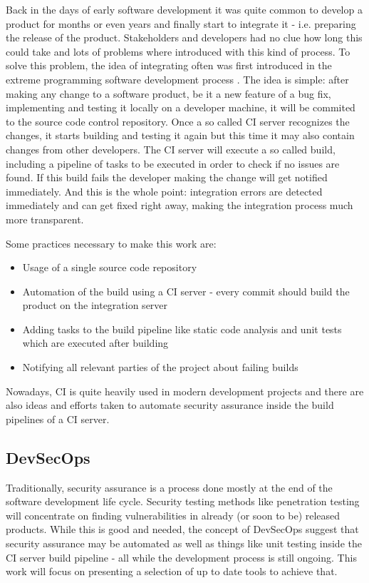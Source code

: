 \documentclass[conference]{IEEEtran}
\begin{document}
Back in the days of early software development it was quite common to develop a product for months or even years and finally start to integrate it - i.e. preparing the release of the product. Stakeholders and developers had no clue how long this could take and lots of problems where introduced with this kind of process. To solve this problem, the idea of integrating often was first introduced in the extreme programming software development process \cite{xp}. The idea is simple: after making any change to a software product, be it a new feature of a bug fix, implementing and testing it locally on a developer machine, it will be commited to the source code control repository. Once a so called CI server recognizes the changes, it starts building and testing it again but this time it may also contain changes from other developers. The CI server will execute a so called build, including a pipeline of tasks to be executed in order to check if no issues are found. If this build fails the developer making the change will get notified immediately. And this is the whole point: integration errors are detected immediately and can get fixed right away, making the integration process much more transparent.

Some practices necessary to make this work are: 

\begin{itemize}
	\item Usage of a single source code repository
	\item Automation of the build using a CI server - every commit should build the product on the integration server
	\item Adding tasks to the build pipeline like static code analysis and unit tests which are executed after building
	\item Notifying all relevant parties of the project about failing builds
\end{itemize}

Nowadays, CI is quite heavily used in modern development projects and there are also ideas and efforts taken to automate security assurance inside the build pipelines of a CI server. 

\subsection{DevSecOps}

Traditionally, security assurance is a process done mostly at the end of the software development life cycle. Security testing methods like penetration testing will concentrate on finding vulnerabilities in already (or soon to be) released products. While this is good and needed, the concept of DevSecOps suggest that security assurance may be automated as well as things like unit testing inside the CI server build pipeline - all while the development process is still ongoing. This work will focus on presenting a selection of up to date tools to achieve that.
\end{document}
